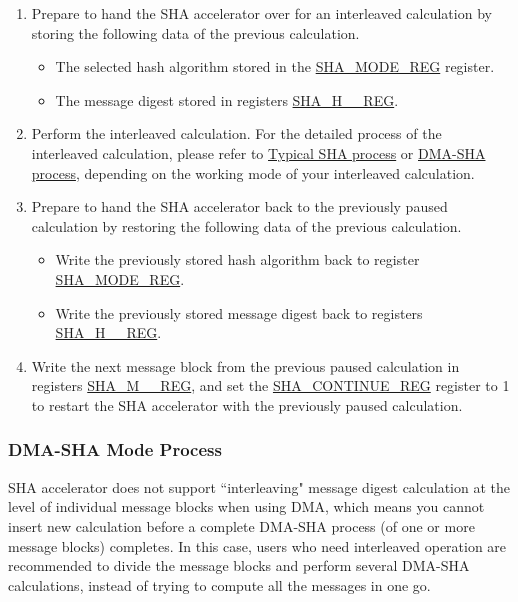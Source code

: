 \documentclass[main\_\_EN.tex]{subfiles}
\begin{document}
\begin{enumerate}
    \item Prepare to hand the SHA accelerator over for an interleaved calculation by storing the following data of the previous calculation.
        \begin{itemize}
            \item The selected hash algorithm stored in the \hyperref[regdesc:SHAMODEREG]{SHA\_MODE\_REG} register.
            \item The message digest stored in registers \hyperref[regdesc:SHAHNREG]{SHA\_H\_\_REG}.
        \end{itemize}
    \item Perform the interleaved calculation. For the detailed process of the interleaved calculation, please refer to \hyperref[sec:sha-typical-sha]{Typical SHA process} or \hyperref[sec:sha-dma-sha]{DMA-SHA process}, depending on the working mode of your interleaved calculation.
    \item Prepare to hand the SHA accelerator back to the previously paused calculation by restoring the following data of the previous calculation.
        \begin{itemize}
            \item Write the previously stored hash algorithm back to register \hyperref[regdesc:SHAMODEREG]{SHA\_MODE\_REG}.
            \item Write the previously stored message digest back to registers \hyperref[regdesc:SHAHNREG]{SHA\_H\_\_REG}.
        \end{itemize}
    \item Write the next message block from the previous paused calculation in registers \hyperref[regdesc:SHAMNREG]{SHA\_M\_\_REG}, and set the \hyperref[regdesc:SHACONTINUEREG]{SHA\_CONTINUE\_REG} register to 1 to restart the SHA accelerator with the previously paused calculation. 
\end{enumerate}



\subsubsection{DMA-SHA Mode Process}\label{sec:sha-dma-sha}

\chipname{} SHA accelerator does not support ``interleaving" message digest calculation at the level of individual message blocks when using DMA, which means you cannot insert new calculation before a complete DMA-SHA process (of one or more message blocks) completes. In this case, users who need interleaved operation are recommended to divide the message blocks and perform several DMA-SHA calculations, instead of trying to compute all the messages in one go.
\end{document}
